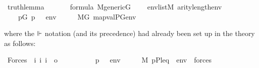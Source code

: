 \begin{isabelle}
\isamarkupfalse%
\ truth{\isacharunderscore}{\kern0pt}lemma{\isacharcolon}{\kern0pt}\isanewline
\ \ \isanewline
\ \ \ \ {\isachardoublequoteopen}{\isasymphi}{\isasymin}formula{\isachardoublequoteclose}\ {\isachardoublequoteopen}M{\isacharunderscore}{\kern0pt}generic{\isacharparenleft}{\kern0pt}G{\isacharparenright}{\kern0pt}{\isachardoublequoteclose}\isanewline
\ \ \ \ {\isachardoublequoteopen}env{\isasymin}list{\isacharparenleft}{\kern0pt}M{\isacharparenright}{\kern0pt}{\isachardoublequoteclose}\ {\isachardoublequoteopen}arity{\isacharparenleft}{\kern0pt}{\isasymphi}{\isacharparenright}{\kern0pt}{\isasymle}length{\isacharparenleft}{\kern0pt}env{\isacharparenright}{\kern0pt}{\isachardoublequoteclose}\isanewline
\ \ \isanewline
\ \ \ \ {\isachardoublequoteopen}{\isacharparenleft}{\kern0pt}{\isasymexists}p{\isasymin}G{\isachardot}{\kern0pt}\ p\ {\isasymtturnstile}\ {\isasymphi}\ env{\isacharparenright}{\kern0pt}\ \ \ {\isasymlongleftrightarrow}\ \ \ M{\isacharbrackleft}{\kern0pt}G{\isacharbrackright}{\kern0pt}{\isacharcomma}{\kern0pt}\ map{\isacharparenleft}{\kern0pt}val{\isacharparenleft}{\kern0pt}P{\isacharcomma}{\kern0pt}G{\isacharparenright}{\kern0pt}{\isacharcomma}{\kern0pt}env{\isacharparenright}{\kern0pt}\ {\isasymTurnstile}\ {\isasymphi}{\isachardoublequoteclose}
\end{isabelle}
where the $\Vdash$ notation (and its precedence) had already been set up in the
 theory as follows:
\begin{isabelle}
\isamarkupfalse%
\ Forces\ {\isacharcolon}{\kern0pt}{\isacharcolon}{\kern0pt}\ {\isachardoublequoteopen}{\isacharbrackleft}{\kern0pt}i{\isacharcomma}{\kern0pt}\ i{\isacharcomma}{\kern0pt}\ i{\isacharbrackright}{\kern0pt}\ {\isasymRightarrow}\ o{\isachardoublequoteclose}\ \ {\isacharparenleft}{\kern0pt}{\isachardoublequoteopen}{\isacharunderscore}{\kern0pt}\ {\isasymtturnstile}\ {\isacharunderscore}{\kern0pt}\ {\isacharunderscore}{\kern0pt}{\isachardoublequoteclose}\ {\isacharbrackleft}{\kern0pt}{}{}{\isacharcomma}{\kern0pt}{}{}{\isacharcomma}{\kern0pt}{}{}{\isacharbrackright}{\kern0pt}\ {}{}{\isacharparenright}{\kern0pt}\ \isanewline
\ \ {\isachardoublequoteopen}p\ {\isasymtturnstile}\ {\isasymphi}\ env\ \ \ {\isasymequiv}\ \ \ M{\isacharcomma}{\kern0pt}\ {\isacharparenleft}{\kern0pt}{\isacharbrackleft}{\kern0pt}p{\isacharcomma}{\kern0pt}P{\isacharcomma}{\kern0pt}leq{\isacharcomma}{\kern0pt}{\isasymone}{\isacharbrackright}{\kern0pt}\ {\isacharat}{\kern0pt}\ env{\isacharparenright}{\kern0pt}\ {\isasymTurnstile}\ forces{\isacharparenleft}{\kern0pt}{\isasymphi}{\isacharparenright}{\kern0pt}{\isachardoublequoteclose}\isanewline
\end{isabelle}

